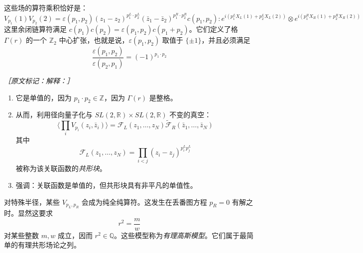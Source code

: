 这些场的算符乘积恰好是：
\begin{equation}
  V_{p_1}(1)V_{p_2}(2)=\varepsilon(p_1,p_2)(z_1-z_2)^{p_1^L\cdot p_2^L}(\bar z_1-\bar z_2)^{p_1^R\cdot p_2^R}c(p_1,p_2):e^{i(p_1^LX_L(1)+p_2^LX_L(2))}\otimes e^{i(p_1^RX_R(1)+p_2^RX_R(2))}
  \tag{2.320}
  \label{eq:2.320}
\end{equation}
这里余闭链算符满足 $c(p_1)c(p_2)=\varepsilon(p_1,p_2)c(p_1+p_2)$。它们定义了格 $\Gamma(r)$ 的一个 $\mathbb{Z}_2$ 中心扩张，也就是说，$\varepsilon(p_1,p_2)$ 取值于 $\{\pm1\}$，并且必须满足
\begin{equation}
  \frac{\varepsilon(p_1,p_2)}{\varepsilon(p_2,p_1)}=(-1)^{p_1\cdot p_2}
  \tag{2.321}
  \label{eq:2.321}
\end{equation}

{\small\itshape ［原文标记：解释：］}
\begin{enumerate}
  \item 它是单值的，因为 $p_1\cdot p_2\in\mathbb{Z}$，因为 $\Gamma(r)$ 是整格。
  \item 从而，利用径向量子化与 $SL(2,\mathbb{R})\times SL(2,\mathbb{R})$ 不变的真空：
  \begin{equation}
    \langle\prod_iV_{p_i}(z_i,\bar z_i)\rangle
    =\mathcal{F}_L(z_1,\dots,z_N)\tilde{\mathcal{F}}_R(\bar z_1,\dots,\bar z_N)
    \tag{2.322}
    \label{eq:2.322}
  \end{equation}
  其中
  \begin{equation}
    \mathcal{F}_L(z_1,\dots,z_N)=\prod_{i<j}(z_i-z_j)^{p_i^Lp_j^L}
    \tag{2.323}
    \label{eq:2.323}
  \end{equation}
  被称为该关联函数的\emph{共形块}。
  \item 强调：关联函数是单值的，但共形块具有非平凡的单值性。
\end{enumerate}

对特殊半径，某些 $V_{p_L,p_R}$ 会成为纯全纯算符。这发生在丢番图方程 $p_R=0$ 有解之时。显然这要求
\begin{equation}
  r^2=\frac{m}{w}
  \tag{2.324}
  \label{eq:2.324}
\end{equation}
对某些整数 $m,w$ 成立，因而 $r^2\in\mathbb{Q}$。这些模型称为\emph{有理高斯模型}。它们属于最简单的有理共形场论之列。

